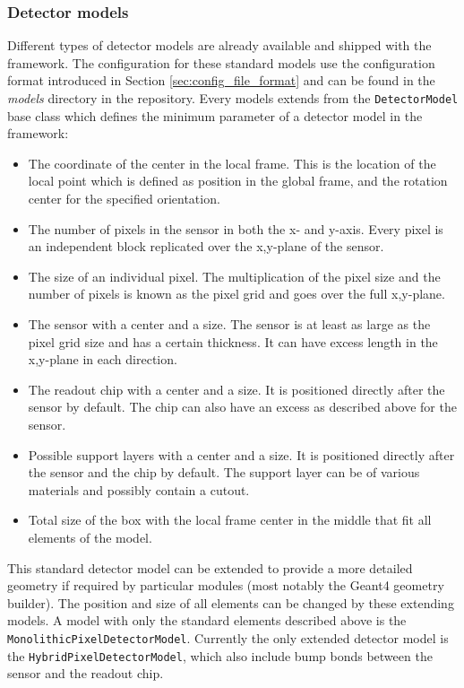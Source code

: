 \subsubsection{Detector models}
\label{sec:detector_models}
Different types of detector models are already available and shipped with the framework. The configuration for these standard models use the configuration format introduced in Section \ref{sec:config_file_format} and can be found in the \textit{models} directory in the repository. Every models extends from the \texttt{DetectorModel} base class which defines the minimum parameter of a detector model in the framework:
\begin{itemize}
\item The coordinate of the center in the local frame. This is the location of the local point which is defined as position in the global frame, and the rotation center for the specified orientation.
\item The number of pixels in the sensor in both the x- and y-axis. Every pixel is an independent block replicated over the x,y-plane of the sensor. 
\item The size of an individual pixel. The multiplication of the pixel size and the number of pixels is known as the pixel grid and goes over the full x,y-plane.
\item The sensor with a center and a size. The sensor is at least as large as the pixel grid size and has a certain thickness. It can have excess length in the x,y-plane in each direction. 
\item The readout chip with a center and a size. It is positioned directly after the sensor by default. The chip can also have an excess as described above for the sensor.
\item Possible support layers with a center and a size. It is positioned directly after the sensor and the chip by default. The support layer can be of various materials and possibly contain a cutout.
\item Total size of the box with the local frame center in the middle that fit all elements of the model.
\end{itemize}
This standard detector model can be extended to provide a more detailed geometry if required by particular modules (most notably the Geant4 geometry builder). The position and size of all elements can be changed by these extending models. A model with only the standard elements described above is the \texttt{MonolithicPixelDetectorModel}. Currently the only extended detector model is the \texttt{HybridPixelDetectorModel}, which also include bump bonds between the sensor and the readout chip. 

